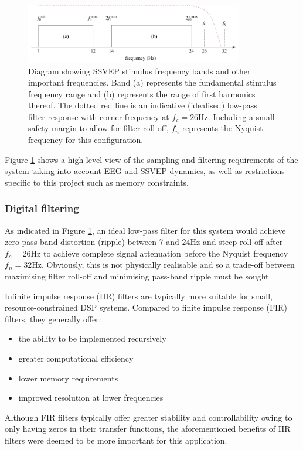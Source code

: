 \begin{figure}
    \centering
    \includegraphics[width=0.85\textwidth]{ssvep-bands}
    \caption[Diagram showing SSVEP stimulus frequency bands and other important frequencies]{Diagram showing SSVEP stimulus frequency bands and other important frequencies. Band (a) represents the fundamental stimulus frequency range and (b) represents the range of first harmonics thereof. The dotted red line is an indicative (idealised) low-pass filter response with corner frequency at $f_c=26$Hz. Including a small safety margin to allow for filter roll-off, $f_n$ represents the Nyquist frequency for this configuration.}
    \label{fig:ssvep-bands}
\end{figure}

Figure \ref{fig:ssvep-bands} shows a high-level view of the sampling and filtering requirements of the system taking into account EEG and SSVEP dynamics, as well as restrictions specific to this project such as memory constraints. 

\subsubsection{Digital filtering}
\label{subsection:digital-filtering}
As indicated in Figure \ref{fig:ssvep-bands}, an ideal low-pass filter for this system would achieve zero pass-band distortion (ripple) between 7 and $24$Hz and steep roll-off after $f_c=26$Hz to achieve complete signal attenuation before the Nyquist frequency $f_n=32$Hz. Obviously, this is not physically realisable and so a trade-off between maximising filter roll-off and minimising pass-band ripple must be sought.  

Infinite impulse response (IIR) filters are typically more suitable for small, resource-constrained DSP systems. Compared to finite impulse response (FIR) filters, they generally offer:
\begin{itemize}
    \item the ability to be implemented recursively
    \item greater computational efficiency
    \item lower memory requirements
    \item improved resolution at lower frequencies
\end{itemize}
Although FIR filters typically offer greater stability and controllability owing to only having zeros in their transfer functions, the aforementioned benefits of IIR filters were deemed to be more important for this application. 

